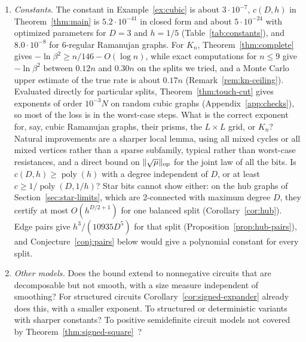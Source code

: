 \begin{enumerate}
\item \emph{Constants.} The constant in Example~\ref{ex:cubic} is about $3\cdot10^{-7}$, $c(D,h)$ in Theorem~\ref{thm:main} is $5.2\cdot10^{-41}$ in closed form and about $5\cdot10^{-24}$ with optimized parameters for $D=3$ and $h=1/5$ (Table~\ref{tab:constants}), and $8.0\cdot10^{-8}$ for 6-regular Ramanujan graphs. For $K_n$, Theorem~\ref{thm:complete} gives $-\ln\beta^2\ge n/146-O(\log n)$, while exact computations for $n\le9$ give $-\ln\beta^2$ between $0.12n$ and $0.30n$ on the splits we tried, and a Monte Carlo upper estimate of the true rate is about $0.17n$ (Remark~\ref{rem:kn-ceiling}). Evaluated directly for particular splits, Theorem~\ref{thm:touch-cut} gives exponents of order $10^{-3}N$ on random cubic graphs (Appendix~\ref{app:checks}), so most of the loss is in the worst-case steps. What is the correct exponent for, say, cubic Ramanujan graphs, their prisms, the $L\times L$ grid, or $K_n$? Natural improvements are a sharper local lemma, using all mixed cycles or all mixed vertices rather than a sparse subfamily, typical rather than worst-case resistances, and a direct bound on $\lVert \sqrt\mu\rVert_{\mathrm{op}}$ for the joint law of all the bits. Is $c(D,h)\ge\operatorname{poly}(h)$ with a degree independent of $D$, or at least $c\ge1/\operatorname{poly}(D,1/h)$? Star bits cannot show either: on the hub graphs of Section~\ref{sec:star-limits}, which are 2-connected with maximum degree $D$, they certify at most $O(h^{D/2+1})$ for one balanced split (Corollary~\ref{cor:hub}). Edge pairs give $h^3/(10935D^5)$ for that split (Proposition~\ref{prop:hub-pairs}), and Conjecture~\ref{conj:pairs} below would give a polynomial constant for every split.

\item \emph{Other models.} Does the bound extend to nonnegative circuits that are decomposable but not smooth, with a size measure independent of smoothing? For structured circuits Corollary~\ref{cor:signed-expander} already does this, with a smaller exponent. To structured or deterministic variants with sharper constants? To positive semidefinite circuit models not covered by Theorem~\ref{thm:signed-square}~\cite{LoconteMengelVergari25,WangVdB25}?


\end{enumerate}
